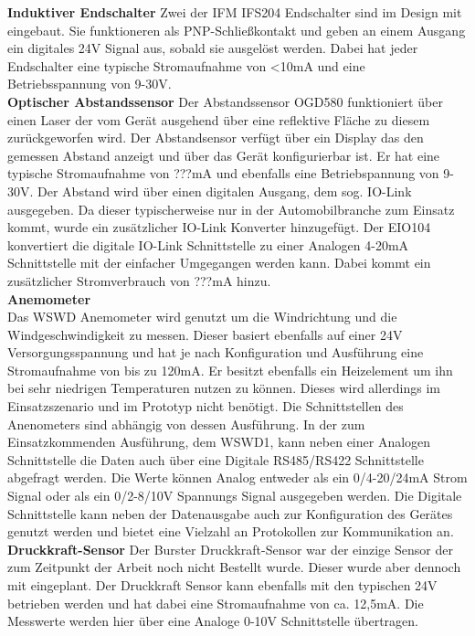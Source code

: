 \noindent\textbf{Induktiver Endschalter}\newline
Zwei der IFM IFS204 Endschalter sind im Design mit eingebaut. Sie funktioneren als PNP-Schließkontakt und geben an einem Ausgang ein digitales 24V Signal aus, sobald sie ausgelöst werden. Dabei hat jeder Endschalter eine typische Stromaufnahme von <10mA und eine Betriebsspannung von 9-30V.\\

\noindent\textbf{Optischer Abstandssensor}\newline
Der Abstandssensor OGD580 funktioniert über einen Laser der vom Gerät ausgehend über eine reflektive Fläche zu diesem zurückgeworfen wird. Der Abstandsensor verfügt über ein Display das den gemessen Abstand anzeigt und über das Gerät konfigurierbar ist. Er hat eine typische Stromaufnahme von ???mA und ebenfalls eine Betriebspannung von 9-30V. Der Abstand wird über einen digitalen Ausgang, dem sog. IO-Link ausgegeben. Da dieser typischerweise nur in der Automobilbranche zum Einsatz kommt, wurde ein zusätzlicher IO-Link Konverter hinzugefügt. Der EIO104 konvertiert die digitale IO-Link Schnittstelle zu einer Analogen 4-20mA Schnittstelle mit der einfacher Umgegangen werden kann. Dabei kommt ein zusätzlicher Stromverbrauch von ???mA hinzu.\\

\noindent\textbf{Anemometer}\\
Das WSWD Anemometer wird genutzt um die Windrichtung und die Windgeschwindigkeit zu messen. Dieser basiert ebenfalls auf einer 24V Versorgungsspannung und hat je nach Konfiguration und Ausführung eine Stromaufnahme von bis zu 120mA. Er besitzt ebenfalls ein Heizelement um ihn bei sehr niedrigen Temperaturen nutzen zu können. Dieses wird allerdings im Einsatzszenario und im Prototyp nicht benötigt. Die Schnittstellen des Anenometers sind abhängig von dessen Ausführung. In der zum Einsatzkommenden Ausführung, dem WSWD1, kann neben einer Analogen Schnittstelle die Daten auch über eine Digitale RS485/RS422 Schnittstelle abgefragt werden. Die Werte können Analog entweder als ein 0/4-20/24mA Strom Signal oder als ein 0/2-8/10V Spannungs Signal ausgegeben werden. Die Digitale Schnittstelle kann neben der Datenausgabe auch zur Konfiguration des Gerätes genutzt werden und bietet eine Vielzahl an Protokollen zur Kommunikation an.\\

\noindent\textbf{Druckkraft-Sensor}\newline
Der Burster Druckkraft-Sensor war der einzige Sensor der zum Zeitpunkt der Arbeit noch nicht Bestellt wurde. Dieser wurde aber dennoch mit eingeplant. Der Druckkraft Sensor kann ebenfalls mit den typischen 24V betrieben werden und hat dabei eine Stromaufnahme von ca. 12,5mA. Die Messwerte werden hier über eine Analoge 0-10V Schnittstelle übertragen.\\
